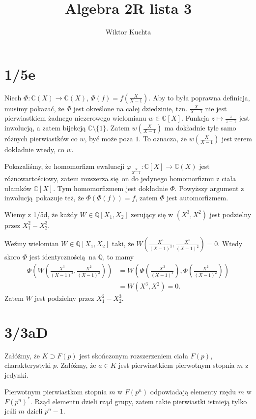 \documentclass[a4paper, 12pt]{article}
\title{Algebra 2R lista 3}
\author{Wiktor Kuchta}
\date{\vspace{-4ex}}
\newcommand{\+}{\enspace}
\begin{document}
\maketitle

\section*{1/5e}
Niech $Φ: ℂ(X) → ℂ(X)$, $Φ(f) = f\left(\frac{X}{X-1}\right)$.
Aby to była poprawna definicja, musimy pokazać, że $Φ$ jest określone na całej dziedzinie,
tzn. $\frac{X}{X-1}$ nie jest pierwiastkiem żadnego niezerowego wielomianu $w∈ℂ[X]$.
Funkcja $z ↦ \frac{z}{z-1}$ jest inwolucją, a zatem bijekcją $ℂ \setminus \{ 1 \}$.
Zatem $w\left( \frac{X}{X-1} \right)$ ma dokładnie tyle samo różnych pierwiastków co $w$, być może poza $1$.
To oznacza, że $w\left( \frac{X}{X-1} \right)$ jest zerem dokładnie wtedy, co $w$.

Pokazaliśmy, że homomorfizm ewaluacji $φ_{\frac{X}{X-1}}: ℂ[X] → ℂ(X)$ jest różnowartościowy,
zatem rozszerza się on do jedynego homomorfizmu z ciała ułamków $ℂ[X]$.
Tym homomorfizmem jest dokładnie $Φ$.
Powyższy argument z inwolucją pokazuje też, że $Φ(Φ(f)) = f$, zatem $Φ$ jest
automorfizmem.

Wiemy z 1/5d, że każdy $W ∈ ℚ[X_1, X_2]$ zerujący się w $(X^3, X^2)$
jest podzielny przez $X_1^2 - X_2^3$.

Weźmy wielomian $W ∈ ℚ[X_1, X_2]$ taki, że
$W\left( \frac{X^3}{(X-1)^3}, \frac{X^2}{(X-1)^2} \right) = 0$.
Wtedy skoro $Φ$ jest identycznością na $ℚ$, to mamy
\begin{align*}
Φ\left(W\left( \frac{X^3}{(X-1)^3}, \frac{X^2}{(X-1)^2} \right)\right)
&= W\left( Φ\left(\frac{X^3}{(X-1)^3}\right), Φ\left(\frac{X^2}{(X-1)^2}\right) \right) \\
&= W(X^3, X^2) = 0.
\end{align*}
Zatem $W$ jest podzielny przez $X_1^2 - X_2^3$.


\section*{3/3aD}
Załóżmy, że $K ⊃ F(p)$ jest skończonym rozszerzeniem ciała $F(p)$,
charakterystyki $p$.
Załóżmy, że $a ∈ K$ jest pierwiastkiem pierwotnym stopnia $m$ z jedynki.

Pierwotnym pierwiastkom stopnia $m$ w $F(p^n)$ odpowiadają elementy rzędu $m$ w
$F(p^n)^*$.
Rząd elementu dzieli rząd grupy,
zatem takie pierwiastki istnieją tylko jeśli $m$ dzieli $p^n-1$.
\end{document}
